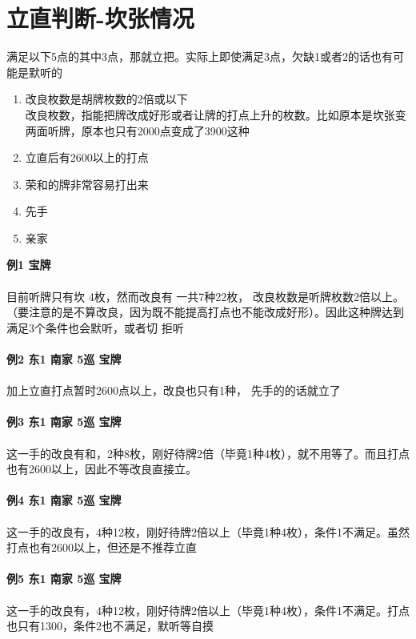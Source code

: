 \documentclass[小V的日麻笔记.tex]{subfiles}
\begin{document}
\section{立直判断-坎张情况}
满足以下5点的其中3点，那就立把。实际上即使满足3点，欠缺1或者2的话也有可能是默听的
\begin{enumerate}
\item 改良枚数是胡牌枚数的2倍或以下
\\
改良枚数，指能把牌改成好形或者让牌的打点上升的枚数。比如原本是坎张变两面听牌，原本也只有2000点变成了3900这种
\item 立直后有2600以上的打点
\item 荣和的牌非常容易打出来
\item 先手
\item 亲家
\end{enumerate}

\textbf{例1 宝牌}
\\
\\
目前听牌只有坎 4枚，然而改良有 一共7种22枚， 改良枚数是听牌枚数2倍以上。 （要注意的是不算改良，因为既不能提高打点也不能改成好形）。因此这种牌达到满足3个条件也会默听，或者切 拒听
\\
\hrulefill 
\\
\textbf{例2 东1 南家 5巡 宝牌}
\\
\\
加上立直打点暂时2600点以上，改良也只有1种， 先手的的话就立了
\\
\hrulefill 
\\
\textbf{例3 东1 南家 5巡 宝牌}
\\
\\
这一手的改良有和，2种8枚，刚好待牌2倍（毕竟1种4枚），就不用等了。而且打点也有2600以上，因此不等改良直接立。
\\
\hrulefill 
\\
\textbf{例4 东1 南家 5巡 宝牌}
\\
\\
这一手的改良有，4种12枚，刚好待牌2倍以上（毕竟1种4枚），条件1不满足。虽然打点也有2600以上，但还是不推荐立直
\\
\hrulefill 
\\
\textbf{例5 东1 南家 5巡 宝牌}
\\
\\
这一手的改良有，4种12枚，刚好待牌2倍以上（毕竟1种4枚），条件1不满足。打点也只有1300，条件2也不满足，默听等自摸
\end{document}
